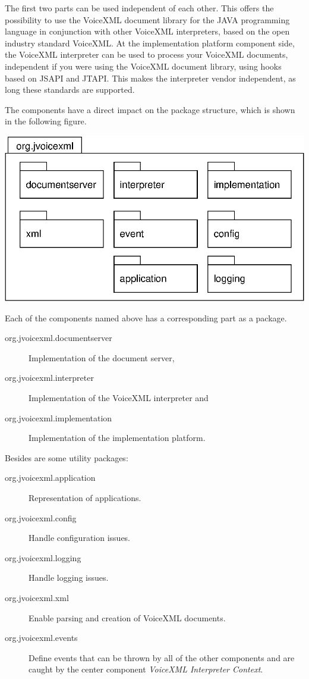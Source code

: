 \documentclass[11pt,a4paper]{article}
\begin{document}
The first two parts can be used independent of each other. 
This offers the possibility
to use the VoiceXML document library for the JAVA programming language 
in conjunction with other VoiceXML interpreters, based on the open
industry standard VoiceXML.
At the implementation platform component side, the VoiceXML interpreter can be
used to process your VoiceXML documents, independent if you were using the 
VoiceXML document library, using hooks based on JSAPI and JTAPI.
This makes the interpreter vendor independent, as long these standards
are supported.

The components have a direct impact on the package structure, which is shown
in the following figure.

\begin{center}
\includegraphics{package-org.jvoicexml.eps}
\end{center}

Each of the components named above has a corresponding part as a package. 
\begin{description}
\item[org.jvoicexml.documentserver] Implementation of the document server,
\item[org.jvoicexml.interpreter] Implementation of the VoiceXML interpreter and
\item[org.jvoicexml.implementation] Implementation of the implementation 
platform.
\end{description}

Besides are some utility packages:
\begin{description}
\item[org.jvoicexml.application] Representation of applications.
\item[org.jvoicexml.config] Handle configuration issues.
\item[org.jvoicexml.logging] Handle logging issues.
\item[org.jvoicexml.xml] Enable parsing and creation of VoiceXML documents.
\item[org.jvoicexml.events] Define events that can be thrown by all of the 
other components and are caught by the center component 
\emph{VoiceXML Interpreter Context}.
\end{description}
\end{document}
